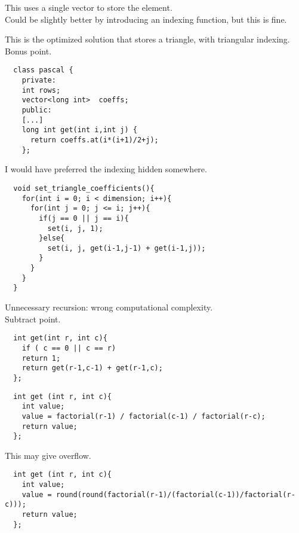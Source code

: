 This uses a single vector to store the element.\\
Could be slightly better by introducing an indexing function, but this is fine.


This is the optimized solution that stores a triangle,
with triangular indexing.
Bonus point.

\begin{lstlisting}
  class pascal {
    private:
    int rows;
    vector<long int>  coeffs;
    public:
    [...]
    long int get(int i,int j) {
      return coeffs.at(i*(i+1)/2+j);
    };
\end{lstlisting}

I would have preferred the indexing hidden somewhere.


\begin{lstlisting}
  void set_triangle_coefficients(){
    for(int i = 0; i < dimension; i++){
      for(int j = 0; j <= i; j++){
        if(j == 0 || j == i){
          set(i, j, 1);
        }else{
          set(i, j, get(i-1,j-1) + get(i-1,j));
        }
      }
    }
  }
\end{lstlisting}


Unnecessary recursion: wrong computational complexity.\\
Subtract point.

\begin{lstlisting}
  int get(int r, int c){
    if ( c == 0 || c == r)
    return 1;
    return get(r-1,c-1) + get(r-1,c);
  };
\end{lstlisting}


\begin{lstlisting}
  int get (int r, int c){
    int value;
    value = factorial(r-1) / factorial(c-1) / factorial(r-c);
    return value;
  };
\end{lstlisting}

This may give overflow.


\begin{lstlisting}
  int get (int r, int c){
    int value;
    value = round(round(factorial(r-1)/(factorial(c-1))/factorial(r-c)));
    return value;
  };
\end{lstlisting}

